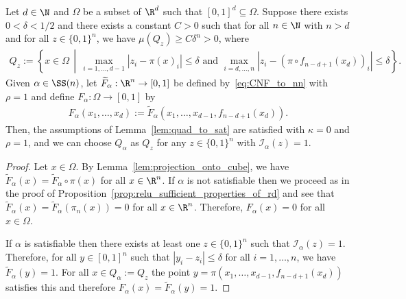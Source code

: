 \documentclass{amsart}[11pt]
\numberwithin{equation}{section}
\newcommand{\interpretation}{\mathcal{I}}
\numberwithin{theorem}{section}
\begin{document}
\begin{proposition}\label{prop:relu_sufficient_properties_of_rd_omega}
    Let $d \in \N$ and $\Omega$ be a subset of $\R^d$ such that $[0, 1]^d \subseteq \Omega$. Suppose there exists $0 <  \delta < 1/2$ and there exists a constant $C > 0$ such that for all $n \in \N$ with $n > d$ and for all $z \in \{0, 1\}^n$, we have $\mu(Q_z) \geq C\delta^n > 0$, where 
    \begin{align*}
        Q_z := \left\{x \in \Omega \, \middle| \, \max_{i = 1, \ldots, d - 1} |z_i -\pi(x)_i| \leq \delta \text{ and } \max_{i = d, \ldots, n} |z_i - (\pi \circ f_{n - d + 1}(x_d))_i| \leq \delta\right\}.
    \end{align*}
    Given $\alpha \in \SS(n)$, let $\widetilde F_\alpha: \R^n \to [0, 1]$ be defined by~\eqref{eq:CNF_to_nn} with $\rho=1$ and define $F_\alpha: \Omega \to [0, 1]$  by
    \begin{align*}
        F_\alpha(x_1, \ldots, x_d) := \widetilde F_\alpha(x_1, \ldots, x_{d - 1}, f_{n - d + 1}(x_d)).
    \end{align*}
    Then, the assumptions of Lemma~\ref{lem:quad_to_sat} are satisfied with $\kappa=0$ and $\rho=1$, and we can choose $Q_\alpha$ as $Q_z$ for any $z\in\{0,1\}^n$ with $\interpretation_\alpha(z)=1$.
\end{proposition}
\begin{proof}
    Let $x\in\Omega$. By Lemma~\ref{lem:projection_onto_cube}, we have $\widetilde F_\alpha(x)=\widetilde F_\alpha \circ \pi(x)$ for all $x \in \R^n$.
If $\alpha$ is not satisfiable then we proceed as in the proof of Proposition~\ref{prop:relu_sufficient_properties_of_rd} and see that $\widetilde F_\alpha(x) = \widetilde F_\alpha(\pi_n(x))=0$ for all $x \in \R^n$. Therefore, $F_\alpha(x) = 0$ for all $x \in \Omega$.

If $\alpha$ is satisfiable then there exists at least one $z\in \{0,1\}^n$ such that $\interpretation_\alpha(z)=1$. Therefore, for all $y \in [0, 1]^n$ such that $|y_i - z_i| \leq \delta$ for all $i = 1, \ldots, n$, we have $\widetilde F_\alpha(y) = 1$. For all $x \in Q_\alpha := Q_z$ the point $y = \pi(x_1, \ldots, x_{d - 1}, f_{n - d + 1}(x_d))$ satisfies this and therefore $F_\alpha(x) = \widetilde F_\alpha(y) = 1$.
\end{proof}
\end{document}

